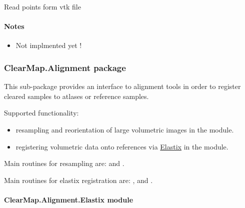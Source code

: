\documentclass[letterpaper,10pt,english]{sphinxmanual}
\begin{document}

\begin{fulllineitems}
\label{api/ClearMap.IO:ClearMap.IO.VTK.readPoints}
Read points form vtk file
\paragraph{Notes}
\begin{itemize}
\item {} 
Not implmented yet !

\end{itemize}

\end{fulllineitems}



\subsubsection{ClearMap.Alignment package}
\label{api/ClearMap.Alignment::doc}\label{api/ClearMap.Alignment:clearmap-alignment-package}\label{api/ClearMap.Alignment:module-ClearMap.Alignment}
This sub-package provides an interface to alignment tools in order to
register cleared samples to atlases or reference samples.

Supported functionality:
\begin{itemize}
\item {} 
resampling and reorientation of large volumetric images in the
 module.

\item {} 
registering volumetric data onto references via
\href{http://elastix.isi.uu.nl/}{Elastix} in the
 module.

\end{itemize}

Main routines for resampling are:
and .

Main routines for elastix registration are:
,
 and
.


\paragraph{ClearMap.Alignment.Elastix module}
\label{api/ClearMap.Alignment:clearmap-alignment-elastix-module}
\end{document}
